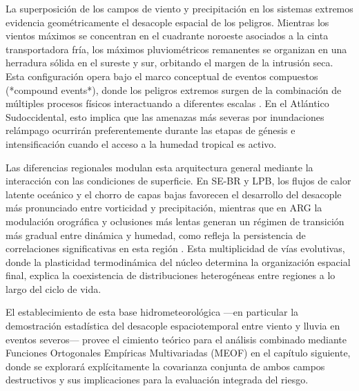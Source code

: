 La superposición de los campos de viento y precipitación en los sistemas extremos evidencia geométricamente el desacople espacial de los peligros. Mientras los vientos máximos se concentran en el cuadrante noroeste asociados a la cinta transportadora fría, los máximos pluviométricos remanentes se organizan en una herradura sólida en el sureste y sur, orbitando el margen de la intrusión seca. Esta configuración opera bajo el marco conceptual de eventos compuestos (*compound events*), donde los peligros extremos surgen de la combinación de múltiples procesos físicos interactuando a diferentes escalas \citep{zscheischler2018future}. En el Atlántico Sudoccidental, esto implica que las amenazas más severas por inundaciones relámpago ocurrirán preferentemente durante las etapas de génesis e intensificación cuando el acceso a la humedad tropical es activo.

Las diferencias regionales modulan esta arquitectura general mediante la interacción con las condiciones de superficie. En SE-BR y LPB, los flujos de calor latente oceánico y el chorro de capas bajas favorecen el desarrollo del desacople más pronunciado entre vorticidad y precipitación, mientras que en ARG la modulación orográfica y oclusiones más lentas generan un régimen de transición más gradual entre dinámica y humedad, como refleja la persistencia de correlaciones significativas en esta región \citep{marrafon2022classificacao}. Esta multiplicidad de vías evolutivas, donde la plasticidad termodinámica del núcleo determina la organización espacial final, explica la coexistencia de distribuciones heterogéneas entre regiones a lo largo del ciclo de vida.

El establecimiento de esta base hidrometeorológica —en particular la demostración estadística del desacople espaciotemporal entre viento y lluvia en eventos severos— provee el cimiento teórico para el análisis combinado mediante Funciones Ortogonales Empíricas Multivariadas (MEOF) en el capítulo siguiente, donde se explorará explícitamente la covarianza conjunta de ambos campos destructivos y sus implicaciones para la evaluación integrada del riesgo.
